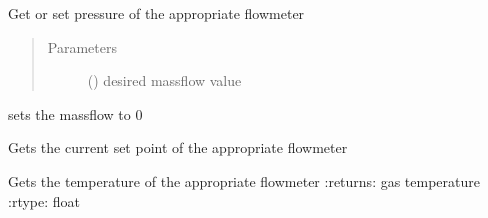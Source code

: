 \documentclass[letterpaper,10pt,english]{sphinxmanual}
\begin{document}
\begin{fulllineitems}
\begin{fulllineitems}
\begin{quote}
\begin{description}
\end{description}\end{quote}

\end{fulllineitems}


\begin{fulllineitems}
\label{\detokenize{drivers:drivers.AlicatController.pressure}}
Get or set pressure of the appropriate flowmeter
\begin{quote}\begin{description}
\item[{Parameters}] \leavevmode
{} () \textendash{} desired massflow value

\end{description}\end{quote}

\end{fulllineitems}


\begin{fulllineitems}
\label{\detokenize{drivers:drivers.AlicatController.reset}}
sets the massflow to 0

\end{fulllineitems}


\begin{fulllineitems}
\label{\detokenize{drivers:drivers.AlicatController.setpoint}}
Gets the current set point of the appropriate flowmeter

\end{fulllineitems}


\begin{fulllineitems}
\label{\detokenize{drivers:drivers.AlicatController.temperature}}
Gets the temperature of the appropriate flowmeter
:returns: gas temperature
:rtype: float


\end{fulllineitems}
\end{fulllineitems}
\end{document}
